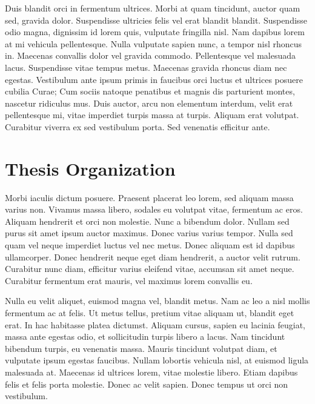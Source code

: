Duis blandit orci in fermentum ultrices. Morbi at quam tincidunt, auctor quam sed, gravida dolor. Suspendisse ultricies felis vel erat blandit blandit. Suspendisse odio magna, dignissim id lorem quis, vulputate fringilla nisl. Nam dapibus lorem at mi vehicula pellentesque. Nulla vulputate sapien nunc, a tempor nisl rhoncus in. Maecenas convallis dolor vel gravida commodo. Pellentesque vel malesuada lacus. Suspendisse vitae tempus metus. Maecenas gravida rhoncus diam nec egestas. Vestibulum ante ipsum primis in faucibus orci luctus et ultrices posuere cubilia Curae; Cum sociis natoque penatibus et magnis dis parturient montes, nascetur ridiculus mus. Duis auctor, arcu non elementum interdum, velit erat pellentesque mi, vitae imperdiet turpis massa at turpis. Aliquam erat volutpat. Curabitur viverra ex sed vestibulum porta. Sed venenatis efficitur ante.

\section{Thesis Organization}

Morbi iaculis dictum posuere. Praesent placerat leo lorem, sed aliquam massa varius non. Vivamus massa libero, sodales eu volutpat vitae, fermentum ac eros. Aliquam hendrerit et orci non molestie. Nunc a bibendum dolor. Nullam sed purus sit amet ipsum auctor maximus. Donec varius varius tempor. Nulla sed quam vel neque imperdiet luctus vel nec metus. Donec aliquam est id dapibus ullamcorper. Donec hendrerit neque eget diam hendrerit, a auctor velit rutrum. Curabitur nunc diam, efficitur varius eleifend vitae, accumsan sit amet neque. Curabitur fermentum erat mauris, vel maximus lorem convallis eu.

Nulla eu velit aliquet, euismod magna vel, blandit metus. Nam ac leo a nisl mollis fermentum ac at felis. Ut metus tellus, pretium vitae aliquam ut, blandit eget erat. In hac habitasse platea dictumst. Aliquam cursus, sapien eu lacinia feugiat, massa ante egestas odio, et sollicitudin turpis libero a lacus. Nam tincidunt bibendum turpis, eu venenatis massa. Mauris tincidunt volutpat diam, et vulputate ipsum egestas faucibus. Nullam lobortis vehicula nisl, at euismod ligula malesuada at. Maecenas id ultrices lorem, vitae molestie libero. Etiam dapibus felis et felis porta molestie. Donec ac velit sapien. Donec tempus ut orci non vestibulum.
